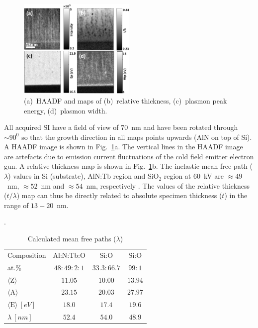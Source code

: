 \documentclass[%
aip,
rsi,%
 amsmath,amssymb,%
 reprint,%
]{revtex4-1}
\begin{document}
\begin{figure}
	\centering
    \includegraphics[width=0.5\textwidth]{combined_haadf}
    \caption{(a)~HAADF and maps of (b)~relative thickness, (c)~plasmon peak energy, (d)~plasmon width.}
    \label{fig:combined_haadf}
\end{figure}
All acquired SI have a field of view of $70$~nm and have been rotated through $\sim90^0$ so that the growth direction in all maps points upwards (AlN on top of Si). A HAADF image is shown in Fig.~\ref{fig:combined_haadf}a. The vertical lines in the HAADF image are artefacts due to emission current fluctuations of the cold field emitter electron gun. A relative thickness map is shown in Fig.~\ref{fig:combined_haadf}b. The inelastic mean free path ($\lambda$) values in Si (substrate), AlN:Tb region and SiO$_2$ region at $60$~kV are $\approx49$~nm, $\approx52$~nm and $\approx54$~nm, respectively \cite{egerton2011}. The values of the relative thickness ($t/\lambda$) map can thus be directly related to absolute specimen thickness ($t$) in the range of $13-20$~nm.
\begin{table}%
	\caption{Calculated mean free paths ($\lambda$)}.
    \label{tab:lambda}
    \begin{ruledtabular}
    	\begin{tabular}{lccc}
        	Composition&Al:N:Tb:O&Si:O&Si:O										\\
            at.\%&$48:49:2:1$&$33.3:66.7$&$99:1$								\\ \hline
        	$\langle \text{Z} \rangle$&$11.05$&$10.00$&$13.94$					\\
            $\langle \text{A} \rangle$&$23.15$&$20.03$&$27.97$					\\
            $\langle \text{E} \rangle~\left[eV\right]$&$18.0$&$17.4$&$19.6$		\\
           	$\lambda~\left[nm\right]$&$52.4$&$54.0$&$48.9$
    	\end{tabular}
    \end{ruledtabular}
\end{table}
\end{document}
